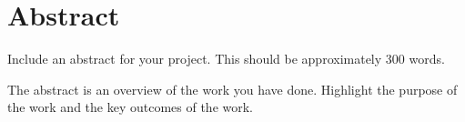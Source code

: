 \thispagestyle{empty}


\section*{\centering Abstract}

Include an abstract for your project. This should be approximately 300 words. 

The abstract is an overview of the work you have done. Highlight the purpose of the work and the key outcomes of the work.

